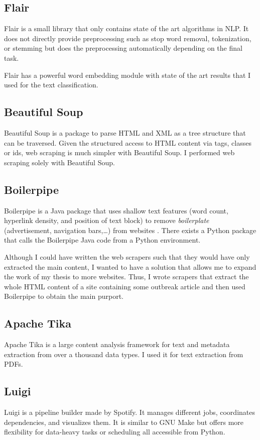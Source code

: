 \subsection{Flair}
Flair is a small library that only contains state of the art algorithms in NLP. It does not directly provide preprocessing such as stop word removal, tokenization, or stemming but does the preprocessing automatically depending on the final task.

Flair has a powerful word embedding module with state of the art results that I used for the text classification.

\subsection{Beautiful Soup}
Beautiful Soup is a package to parse HTML and XML as a tree structure that can be traversed. Given the structured access to HTML content via tags, classes or ids, web scraping is much simpler with Beautiful Soup.
I performed web scraping solely with Beautiful Soup.

\subsection{Boilerpipe}
Boilerpipe is a Java package that uses shallow text features (word count, hyperlink density, and position of text block) to remove \textsl{boilerplate} (advertisement, navigation bars,\dots) from websites \citep{Kohlschutter2010}. There exists a Python package that calls the Boilerpipe Java code from a Python environment.

Although I could have written the web scrapers such that they would have only extracted the main content, I wanted to have a solution that allows me to expand the work of my thesis to more websites. Thus, I wrote scrapers that extract the whole HTML content of a site containing some outbreak article and then used Boilerpipe to obtain the main purport.

\subsection{Apache Tika}\label{Tika}
Apache Tika is a large content analysis framework for text and metadata extraction from over a thousand data types. I used it for text extraction from PDFs.

\subsection{Luigi}
Luigi is a pipeline builder made by Spotify. It manages different jobs, coordinates dependencies, and visualizes them. It is similar to GNU Make but offers more flexibility for data-heavy tasks or scheduling all accessible from Python.

